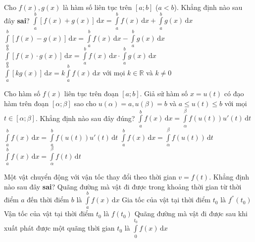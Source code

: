 \begin{ex}%
	Cho $f(x),g(x)$ là hàm số liên tục trên $[a;b]$ ($a <b$). Khẳng định nào sau đây {\bf sai}?
	\choice
	{$\displaystyle\int\limits_a^b [f(x)+g(x)] \mathrm{\,d}x =\displaystyle\int\limits_a^b f(x) \mathrm{\,d}x+\displaystyle\int\limits_a^b g(x) \mathrm{\,d}x$}
	{$\displaystyle\int\limits_a^b [f(x)-g(x)] \mathrm{\,d}x =\displaystyle\int\limits_a^b f(x) \mathrm{\,d}x-\displaystyle\int\limits_a^b g(x) \mathrm{\,d}x$}
	{$\displaystyle\int\limits_a^b [f(x)\cdot g(x)] \mathrm{\,d}x =\displaystyle\int\limits_a^b f(x) \mathrm{\,d}x\cdot \displaystyle\int\limits_a^b g(x) \mathrm{\,d}x$}
	{$\displaystyle\int\limits_a^b [k g(x)] \mathrm{\,d}x =k\displaystyle\int\limits_a^b f(x) \mathrm{\,d}x$ với mọi $k \in \mathbb{R}$ và $k\ne0$}
\end{ex}

\begin{ex}%
	Cho hàm số $f(x)$ liên tục trên đoạn $[a;b]$. Giả sử hàm số $x = u(t)$ có đạo hàm trên đoạn $[\alpha;\beta]$ sao cho $u(\alpha)=a, u(\beta) = b$ và $a \le u(t) \le b$ với mọi $t\in [\alpha;\beta]$. Khẳng định nào sau đây đúng?
	\choice
	{\True $\displaystyle\int\limits_a^b f(x) \mathrm{\,d}x =\displaystyle\int\limits_{\alpha}^{\beta} f(u(t))u'(t) \mathrm{\,d}t $}
	{ $\displaystyle\int\limits_a^b f(x) \mathrm{\,d}x =\displaystyle\int\limits_{a}^{b} f(u(t))u'(t) \mathrm{\,d}t $}
	{ $\displaystyle\int\limits_a^b f(x) \mathrm{\,d}x =\displaystyle\int\limits_{\alpha}^{\beta}  f(u(t)) \mathrm{\,d}t $}
	{ $\displaystyle\int\limits_a^b f(x) \mathrm{\,d}x =\displaystyle\int\limits_{\alpha}^{\beta}  f(t) \mathrm{\,d}t $}
\end{ex}

\begin{ex}%
	Một vật chuyển động với vận tốc thay đổi theo thời gian $v=f(t)$. Khẳng định nào sau đây {\bf sai}?
	\choice
	{Quãng đường mà vật đi được trong khoảng thời gian từ thời điểm $a$ đến thời điểm $b$ là  $\displaystyle\int\limits_a^b f(x) \mathrm{\,d}x$}
	{\True Gia tốc của vật tại thời điểm $t_0$ là $f^{''}(t_0)$}
	{Vận tốc của vật tại thời điểm $t_0$ là $f(t_0)$}
	{Quãng đường mà vật đi được sau khi xuất phát được một quãng thời gian  $t_0$ là  $\displaystyle\int\limits_0^{t_0} f(x) \mathrm{\,d}x$}
\end{ex}

